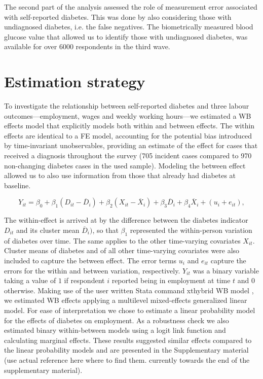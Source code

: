 \documentclass[10pt,letterpaper]{article}
\begin{document}
The second part of the analysis assessed the role of measurement error associated with self-reported diabetes. This was done by also considering those with undiagnosed diabetes, i.e. the false negatives. The biometrically measured blood glucose value that allowed us to identify those with undiagnosed diabetes, was available for over 6000 respondents in the third wave.


\section*{\label{sec:Estimation Strategy}Estimation strategy}

To investigate the relationship between self-reported diabetes and three labour outcomes---employment, wages and weekly working hours---we estimated a \ac{WB} effects model that explicitly models both within and between effects. The within effects are identical to a \ac{FE} model, accounting for the potential bias introduced by time-invariant unobservables, providing an estimate of the effect for cases that received a diagnosis throughout the survey (705 incident cases compared to 970 non-changing diabetes cases in the used sample). Modeling the between effect  allowed us to also use information from those that already had diabetes at baseline.


\begin{equation}
Y_{it}=\beta_{0}+\beta_{1}(D_{it}-\overline{D}_{i})+\beta_{2}(X_{it}-\overline{X}_i)+\beta_{3}\overline{D}_{i}+\beta_{4}\overline{X}_i+(u_{i}+e_{it}),\label{eq:cha4_employed}
\end{equation}

The within-effect is arrived at by the difference between the diabetes indicator $D_{it}$ and its cluster mean $\overline{D}_{i})$, so that $\beta_{1}$ represented the within-person variation of diabetes over time. The same applies to the other time-varying covariates $X_{it}$. Cluster means of diabetes and of all other time-varying covariates were also included to capture the between effect. The error terms $u_{i}$ and $e_{it}$ capture the errors for the within and between variation, respectively. $Y_{it}$ was a binary variable taking a value of $1$ if respondent $i$ reported being in employment at time $t$ and $0$ otherwise. Making use of the user written Stata command xthybrid \ac{WB} model \cite{Schunck2017}, we estimated \ac{WB} effects applying a multilevel mixed-effects generalized linear model. For ease of interpretation we chose to estimate a linear probability model for the effects of diabetes on employment. As a robustness check we also estimated binary within-between models using a logit link function and calculating marginal effects. These results suggested similar effects compared to the linear probability models and are presented in the Supplementary material (use actual reference here where to find them. currently towards the end of the supplementary material).
\end{document}
